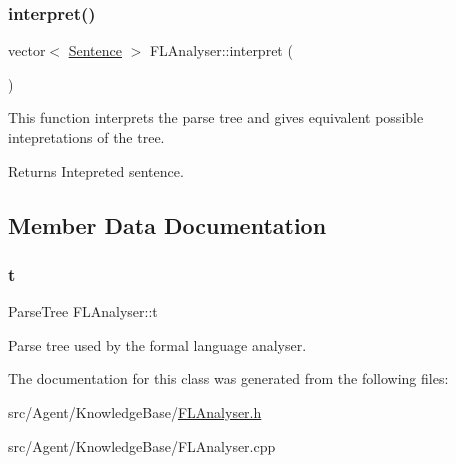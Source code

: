 \subsubsection{\texorpdfstring{interpret()}{interpret()}}
{\footnotesize\ttfamily vector$<$ \mbox{\hyperlink{classSentence}{Sentence}} $>$ F\+L\+Analyser\+::interpret (\begin{DoxyParamCaption}{ }\end{DoxyParamCaption})}



This function interprets the parse tree and gives equivalent possible intepretations of the tree. 

\begin{DoxyReturn}{Returns}
Intepreted sentence. 
\end{DoxyReturn}


\subsection{Member Data Documentation}
\mbox{\label{classFLAnalyser_ad5708840f0ea357a2f81c240b16da54a}} 
\subsubsection{\texorpdfstring{t}{t}}
{\footnotesize\ttfamily Parse\+Tree F\+L\+Analyser\+::t}

Parse tree used by the formal language analyser. 

The documentation for this class was generated from the following files\+:\begin{DoxyCompactItemize}
\item 
src/\+Agent/\+Knowledge\+Base/\mbox{\hyperlink{FLAnalyser_8h}{F\+L\+Analyser.\+h}}\item 
src/\+Agent/\+Knowledge\+Base/F\+L\+Analyser.\+cpp\end{DoxyCompactItemize}
